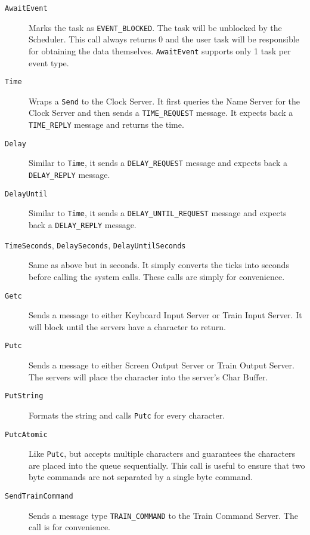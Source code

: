 \documentclass[letterpaper]{article}
\begin{document}
\begin{description}
\item[{\texttt{AwaitEvent}}] \leavevmode 
Marks the task as \texttt{EVENT\_BLOCKED}. The task will be unblocked by the Scheduler. This call always returns 0 and the user task will be responsible for obtaining the data themselves. \texttt{AwaitEvent} supports only 1 task per event type.

\item[{\texttt{Time}}] \leavevmode 
Wraps a \texttt{Send} to the Clock Server. It first queries the Name Server for the Clock Server and then sends a \texttt{TIME\_REQUEST} message. It expects back a \texttt{TIME\_REPLY} message and returns the time.

\item[{\texttt{Delay}}] \leavevmode 
Similar to \texttt{Time}, it sends a \texttt{DELAY\_REQUEST} message and expects back a \texttt{DELAY\_REPLY} message.

\item[{\texttt{DelayUntil}}] \leavevmode 
Similar to \texttt{Time}, it sends a \texttt{DELAY\_UNTIL\_REQUEST} message and expects back a \texttt{DELAY\_REPLY} message.

\item[{\texttt{TimeSeconds}, \texttt{DelaySeconds}, \texttt{DelayUntilSeconds}}] \leavevmode 
Same as above but in seconds. It simply converts the ticks into seconds before calling the system calls. These calls are simply for convenience.

\item[{\texttt{Getc}}] \leavevmode 
Sends a message to either Keyboard Input Server or Train Input Server. It will block until the servers have a character to return.

\item[{\texttt{Putc}}] \leavevmode 
Sends a message to either Screen Output Server or Train Output Server. The servers will place the character into the server's Char Buffer.

\item[{\texttt{PutString}}] \leavevmode 
Formats the string and calls \texttt{Putc} for every character.

\item[{\texttt{PutcAtomic}}] \leavevmode 
Like \texttt{Putc}, but accepts multiple characters and guarantees the characters are placed into the queue sequentially. This call is useful to ensure that two byte commands are not separated by a single byte command.

\item[{\texttt{SendTrainCommand}}] \leavevmode 
Sends a message type \texttt{TRAIN\_COMMAND} to the Train Command Server. The call is for convenience.

\end{description}
\end{document}
